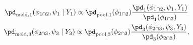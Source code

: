 \begin{gather}
  \pd_{\text{meld}, 1} (\phi_{1 \cap 2}, \psi_{1} \mid Y_{1}) \propto
  \pd_{\text{pool}, 1} (\phi_{1 \cap 2})
  \frac {
    \pd_{1}(\phi_{1 \cap 2}, \psi_{1}, Y_{1})
  } {
    \pd_{1}(\phi_{1 \cap 2})
  }
  \label{eqn:stage-one-targets-one} \\
  \pd_{\text{meld}, 3} (\phi_{2 \cap 3}, \psi_{3} \mid Y_{3}) \propto
  \pd_{\text{pool}, 3} (\phi_{2 \cap 3})
  \frac {
    \pd_{3}(\phi_{2 \cap 3}, \psi_{3}, Y_{3})
  } {
    \pd_{3}(\phi_{2 \cap 3})
  },
  \label{eqn:stage-one-targets-two}
\end{gather}